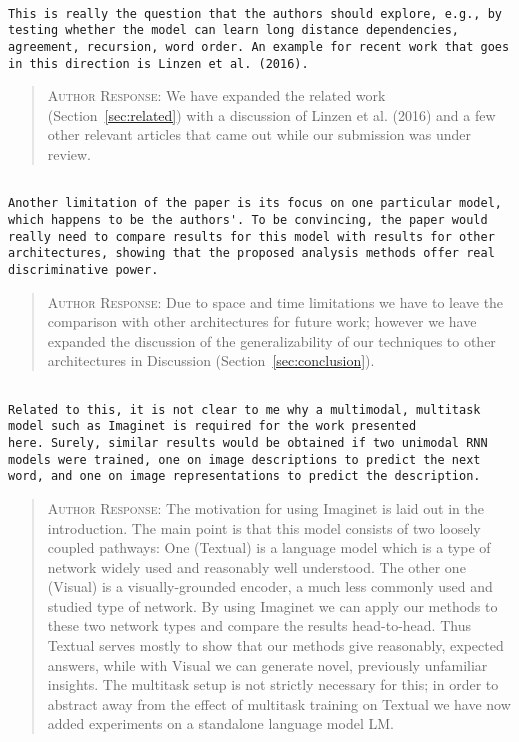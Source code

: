 \begin{verbatim}

This is really the question that the authors should explore, e.g., by
testing whether the model can learn long distance dependencies,
agreement, recursion, word order. An example for recent work that goes
in this direction is Linzen et al. (2016).
\end{verbatim}  
\begin{quote}
\textsc{Author Response:} We have expanded the related work 
(Section~\ref{sec:related}) with a discussion of Linzen et al. (2016) 
and a few other relevant articles that came out while our submission was under review.
\end{quote}
\begin{verbatim}

Another limitation of the paper is its focus on one particular model,
which happens to be the authors'. To be convincing, the paper would
really need to compare results for this model with results for other
architectures, showing that the proposed analysis methods offer real
discriminative power.
\end{verbatim}  
\begin{quote}
\textsc{Author Response:}  Due to space and time limitations we have to 
leave the comparison with other architectures for future work; however we 
have expanded the discussion of the generalizability of our techniques to other
architectures in Discussion (Section~\ref{sec:conclusion}).
\end{quote}
\begin{verbatim}

Related to this, it is not clear to me why a multimodal, multitask
model such as Imaginet is required for the work presented
here. Surely, similar results would be obtained if two unimodal RNN
models were trained, one on image descriptions to predict the next
word, and one on image representations to predict the description.
\end{verbatim}  
\begin{quote}
\textsc{Author Response:}  The motivation for using {\sc Imaginet} is laid
out in the introduction. The main point is that this model consists of
two loosely coupled pathways: One ({\sc Textual}) is a language
model which is a type of network widely used and reasonably well
understood. The other one ({\sc Visual}) is a visually-grounded encoder,
a much less commonly used and studied type of network. By using {\sc
  Imaginet} we can apply our methods to these two network types and
compare the results head-to-head. Thus {\sc Textual} serves
mostly to show that our methods give reasonably, expected answers,
while with {\sc Visual} we can generate novel, previously unfamiliar
insights. The multitask setup is not strictly
necessary for this; in order to abstract away from the effect of multitask
training on {\sc Textual} we have now added experiments on a
standalone language model {\sc LM}.

\end{quote}
